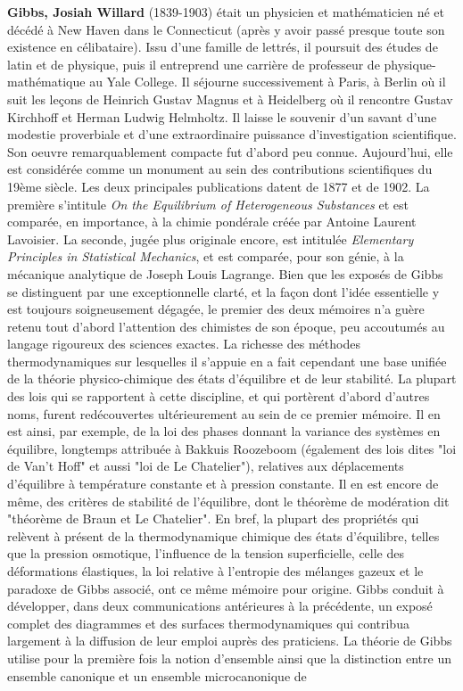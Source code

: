 \textbf{Gibbs, Josiah Willard} (1839-1903) était un physicien et mathématicien né et décédé à New Haven dans le Connecticut (après y avoir passé presque toute son existence en célibataire). Issu d'une famille de lettrés, il poursuit des études de latin et de physique, puis il entreprend une carrière de professeur de physique-mathématique au Yale College. Il séjourne successivement à Paris, à Berlin où il suit les leçons de Heinrich Gustav Magnus et à Heidelberg où il rencontre Gustav Kirchhoff et Herman Ludwig Helmholtz. Il laisse le souvenir d'un savant d'une modestie proverbiale et d'une extraordinaire puissance d'investigation scientifique. Son oeuvre remarquablement compacte fut d'abord peu connue. Aujourd'hui, elle est considérée comme un monument au sein des contributions scientifiques du 19ème siècle. Les deux principales publications datent de 1877 et de 1902. La première s'intitule \textit{On the Equilibrium of Heterogeneous Substances} et est comparée, en importance, à la chimie pondérale créée par Antoine Laurent Lavoisier. La seconde, jugée plus originale encore, est intitulée \textit{Elementary Principles in Statistical Mechanics}, et est comparée, pour son génie, à la mécanique analytique de Joseph Louis Lagrange. Bien que les exposés de Gibbs se distinguent par une exceptionnelle clarté, et la façon dont l'idée essentielle y est toujours soigneusement dégagée, le premier des deux mémoires n'a guère retenu tout d'abord l'attention des chimistes de son époque, peu accoutumés au langage rigoureux des sciences exactes. La richesse des méthodes thermodynamiques sur lesquelles il s'appuie en a fait cependant une base unifiée de la théorie physico-chimique des états d'équilibre et de leur stabilité. La plupart des lois qui se rapportent à cette discipline, et qui portèrent d'abord d'autres noms, furent redécouvertes ultérieurement au sein de ce premier mémoire. Il en est ainsi, par exemple, de la loi des phases donnant la variance des systèmes en équilibre, longtemps attribuée à Bakkuis Roozeboom (également des lois dites "loi de Van't Hoff" et aussi "loi de Le Chatelier"), relatives aux déplacements d'équilibre à température constante et à pression constante. Il en est encore de même, des critères de stabilité de l'équilibre, dont le théorème de modération dit "théorème de Braun et Le Chatelier". En bref, la plupart des propriétés qui relèvent à présent de la thermodynamique chimique des états d'équilibre, telles que la pression osmotique, l'influence de la tension superficielle, celle des déformations élastiques, la loi relative à l'entropie des mélanges gazeux et le paradoxe de Gibbs associé, ont ce même mémoire pour origine. Gibbs conduit à développer, dans deux communications antérieures à la précédente, un exposé complet des diagrammes et des surfaces thermodynamiques qui contribua largement à la diffusion de leur emploi auprès des praticiens. La théorie de Gibbs utilise pour la première fois la notion d'ensemble ainsi que la distinction entre un ensemble canonique et un ensemble microcanonique de 